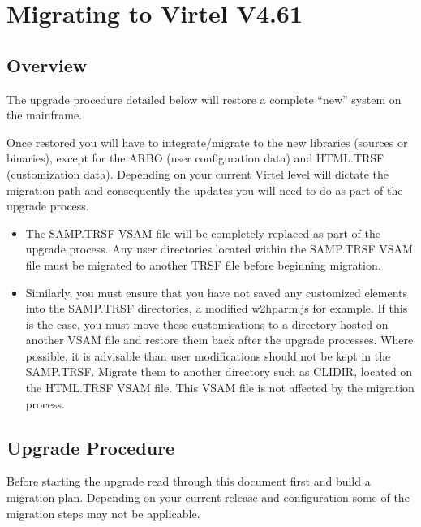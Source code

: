 \documentclass[letterpaper,10pt,english]{sphinxmanual}
\begin{document}
\newpage

\ignorespaces 

\chapter{Migrating to Virtel V4.61}
\label{\detokenize{Migration_Guide:migrating-to-virtel-v4-61}}\label{\detokenize{Migration_Guide:v461mi-introduction}}\label{\detokenize{Migration_Guide:index-0}}

\section{Overview}
\label{\detokenize{Migration_Guide:overview}}
\sphinxAtStartPar
The upgrade procedure detailed below will restore a complete “new” system on the mainframe.

\sphinxAtStartPar
Once restored you will have to integrate/migrate to the new libraries (sources or binaries), except for the ARBO (user configuration data) and HTML.TRSF (customization data). Depending on your current Virtel level will dictate the migration path and consequently the updates you will need to do as part of the upgrade process.
\begin{itemize}
\item {} 
\sphinxAtStartPar
The SAMP.TRSF VSAM file will be completely replaced as part of the upgrade process. Any user directories located within the SAMP.TRSF VSAM file must be migrated to another TRSF file before beginning migration.

\item {} 
\sphinxAtStartPar
Similarly, you must ensure that you have not saved any customized elements into the SAMP.TRSF directories, a modified w2hparm.js for example. If this is the case, you must move these customisations to a directory hosted on another VSAM file and restore them back after the upgrade processes. Where possible, it is advisable than user modifications should not be kept in the SAMP.TRSF. Migrate them to another directory such as CLI\sphinxhyphen{}DIR, located on the HTML.TRSF VSAM file. This VSAM file is not affected by the migration process.

\end{itemize}

\newpage

\ignorespaces 

\section{Upgrade Procedure}
\label{\detokenize{Migration_Guide:upgrade-procedure}}\label{\detokenize{Migration_Guide:index-1}}
\sphinxAtStartPar
Before starting the upgrade read through this document first and build a migration plan. Depending on your current release and configuration some of the migration steps may not be applicable.
\end{document}
